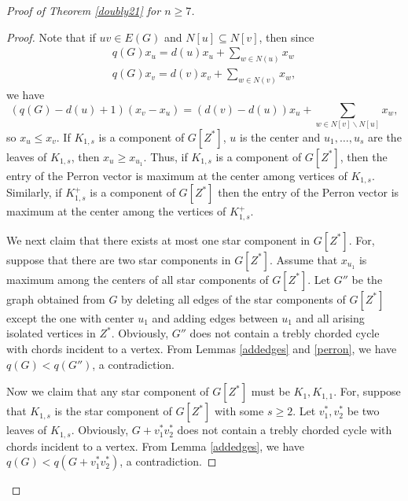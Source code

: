 \documentclass[12pt]{article}
\begin{document}
\begin{proof}[Proof of Theorem \ref{doubly21} for $n\ge 7$]
\begin{proof}
Note that if $uv\in E(G)$ and $N[u]\subseteq N[v]$, then since
\begin{align*}
q(G)x_u=d(u)x_u+\sum_{w\in N(u)}x_w\\
q(G)x_v=d(v)x_v+\sum_{w\in N(v)}x_w,
\end{align*}
we have
\[
\left(q(G)-d(u)+1\right)\left(x_v-x_u\right)=\left(d(v)-d(u)\right)x_u+\sum_{w\in N[v]\backslash N[u]}x_w,
\]
so $x_u\le x_v$. If $K_{1,s}$ is a component of $G[Z^*]$, $u$ is the center and $u_{1},\dots,u_{s}$ are the leaves of $K_{1,s}$, then $x_{u}\ge x_{u_{1}}$. Thus, if $K_{1,s}$ is a component of $G[Z^*]$, then the entry of the Perron vector is maximum  at the center among vertices of $K_{1,s}$. Similarly,
 if  $K_{1,s}^+$ is a component of $G[Z^*]$ then the entry of the Perron vector is maximum at the center among the vertices of $K_{1,s}^+$.




We next claim that there exists at most one star component in $G[Z^*]$.
For, suppose that there are two star components in $G[Z^*]$.
Assume that $x_{u_1}$  is maximum among the centers of all star components of $G[Z^*]$.
Let $G''$ be the graph obtained from $G$ by deleting all edges of the star components of $G[Z^*]$ except the one with center $u_1$ and adding edges between $u_1$ and all arising isolated vertices in $Z^*$.
Obviously, $G''$ does not contain a trebly chorded cycle with chords incident to a vertex.
From Lemmas \ref{addedges} and \ref{perron}, we have $q(G)<q(G'')$, a contradiction.

Now we claim that any star component of $G[Z^*]$ must be $K_1, K_{1,1}$. For,
suppose that $K_{1,s}$ is the star component of $G[Z^*]$ with some $s\ge 2$. Let $v_1^*,v_2^*$ be two leaves of $K_{1,s}$.
Obviously, $G+v_1^*v_2^*$ does not contain a trebly chorded cycle with chords incident to a vertex.
From Lemma \ref{addedges}, we have $q(G)<q(G+v_1^*v_2^*)$, a contradiction.



\end{proof}
\end{proof}
\end{document}
